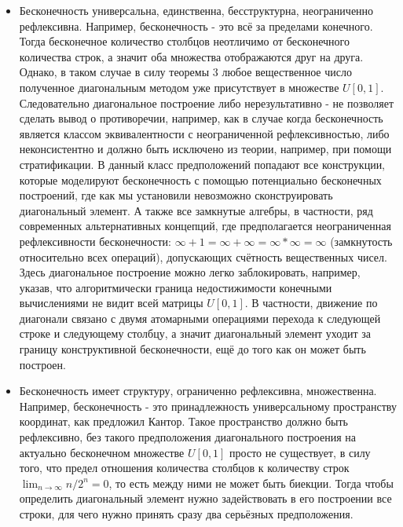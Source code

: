 \documentclass[12pt]{article}
\begin{document}
\begin{itemize}
    \item Бесконечность универсальна, единственна, бесструктурна, неограниченно рефлексивна. Например, бесконечность - это всё за пределами конечного. Тогда бесконечное количество столбцов неотличимо от бесконечного количества строк, а значит оба множества отображаются друг на друга. Однако, в таком случае в силу теоремы 3 любое вещественное число полученное диагональным методом уже присутствует в множестве $U[0, 1]$. Следовательно диагональное построение либо нерезультативно - не позволяет сделать вывод о противоречии, например, как в случае когда бесконечность является классом эквивалентности с неограниченной рефлексивностью, либо неконсистентно и должно быть исключено из теории, например, при помощи стратификации. В данный класс предположений попадают все конструкции, которые моделируют бесконечность с помощью потенциально бесконечных построений, где как мы установили невозможно сконструировать диагональный элемент. А также все замкнутые алгебры, в частности, ряд современных альтернативных концепций, где предполагается неограниченная рефлексивности бесконечности: $\infty + 1 = \infty + \infty = \infty * \infty = \infty$ (замкнутость относительно всех операций), допускающих счётность вещественных чисел. Здесь диагональное построение можно легко заблокировать, например, указав, что алгоритмически граница недостижимости конечными вычислениями не видит всей матрицы $U[0, 1]$. В частности, движение по диагонали связано с двумя атомарными операциями перехода к следующей строке и следующему столбцу, а значит диагональный элемент уходит за границу конструктивной бесконечности, ещё до того как он может быть построен.   
    \item Бесконечность имеет структуру, ограниченно рефлексивна, множественна. Например, бесконечность - это принадлежность универсальному пространству координат, как предложил Кантор. Такое пространство должно быть рефлексивно, без такого предположения диагонального построения на актуально бесконечном множестве $U[0, 1]$ просто не существует, в силу того, что предел отношения количества столбцов к количеству строк $\lim_{n\to\infty} n/2^n = 0$, то есть между ними не может быть биекции. Тогда чтобы определить диагональный элемент нужно задействовать в его построении все строки, для чего нужно принять сразу два серьёзных предположения.
\begin{enumerate}

\end{enumerate}
\end{itemize}
\end{document}
